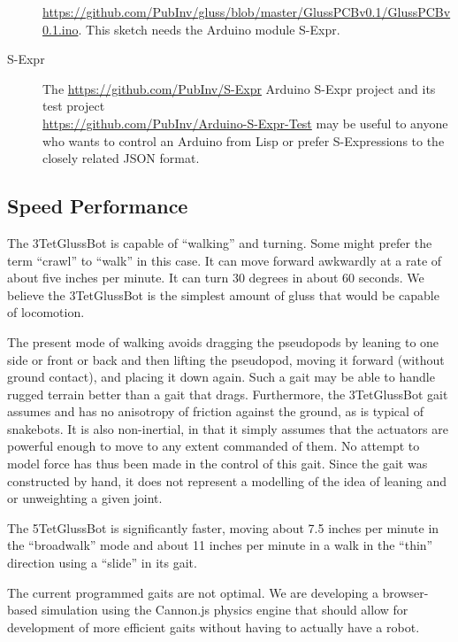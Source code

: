 \documentclass[11pt]{article}
\begin{document}
\begin{description}
\href{https://github.com/PubInv/gluss/blob/master/GlussPCBv0.1/GlussPCBv0.1.ino}
     {https://github.com/PubInv/gluss/blob/master/GlussPCBv0.1/GlussPCBv0.1.ino}.
     This sketch needs the Arduino module S-Expr.
     
\item [S-Expr]
  The \href{https://github.com/PubInv/S-Expr}{https://github.com/PubInv/S-Expr} Arduino S-Expr project and its
  test project \\
  \href{https://github.com/PubInv/Arduino-S-Expr-Test}{https://github.com/PubInv/Arduino-S-Expr-Test} 
  may be useful to anyone who wants to control an Arduino from Lisp or prefer S-Expressions to the closely related JSON format.

  
\end{description}

\subsection{Speed Performance}

The 3TetGlussBot is capable of ``walking'' and turning. Some might prefer the term ``crawl'' to ``walk'' in
this case. It can move forward awkwardly at a rate
of about five inches per minute. It can turn 30 degrees in about 60 seconds.
We believe the 3TetGlussBot is the simplest amount of gluss that would be capable of locomotion.

The present mode of walking avoids dragging the pseudopods by leaning to one side or front or back and
then lifting the pseudopod, moving it forward (without ground contact), and placing it down again.
Such a gait may be able to handle rugged terrain better than a gait that drags. Furthermore, the
3TetGlussBot gait assumes and has no anisotropy of friction against the ground, as is typical
of snakebots.
It is also non-inertial, in that it simply assumes that the actuators are powerful enough to
move to any extent commanded of them. No attempt to model force has thus been made in the control of this gait.
Since the gait was constructed by hand, it does not represent a modelling of the idea of leaning and or
unweighting a given joint.

The 5TetGlussBot is significantly faster, moving about 7.5 inches per minute in the ``broadwalk'' mode
and about 11 inches per minute in a walk in the ``thin'' direction using a ``slide'' in its gait.

The current programmed gaits are not optimal.
We are developing a browser-based simulation using the Cannon.js physics engine that should allow for development
of more efficient gaits without having to actually have a robot.
\end{document}
